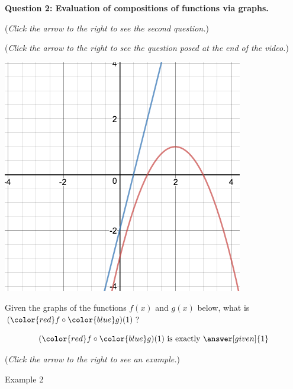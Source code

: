 \documentclass{ximera}
\begin{document}
\textbf{Question 2: Evaluation of compositions
of functions via graphs.}
\begin{question}
\begin{flushright}
{\color{blue}(\emph{Click the arrow to the right to see the second question.})}
\end{flushright}
\begin{center}
\begin{expandable}
{\color{blue}(\emph{Click the arrow to the right to see the question
posed at the end of the video.})}
\begin{expandable}
\begin{center}
\includegraphics[scale=0.3]{CompFuncGraph1.png}\\
\end{center}
Given the graphs of the functions {\color{red} $f(x)$}
and {\color{blue} $g(x)$} below, what is
$({\color{red} f} \circ {\color{blue} g})(1)$?\\
\begin{center}
\end{center}
\begin{prompt}
\[
({\color{red} f} \circ {\color{blue} g})(1) \text{ is exactly }\answer[given]{1}
\]
\end{prompt}
\begin{flushright}
{\color{blue}(\emph{Click the arrow to the right to see an example.})}
\end{flushright}
\begin{expandable}
Example 2
\end{expandable}
\end{expandable}
\end{expandable}
\end{center}
\end{question}
\end{document}
